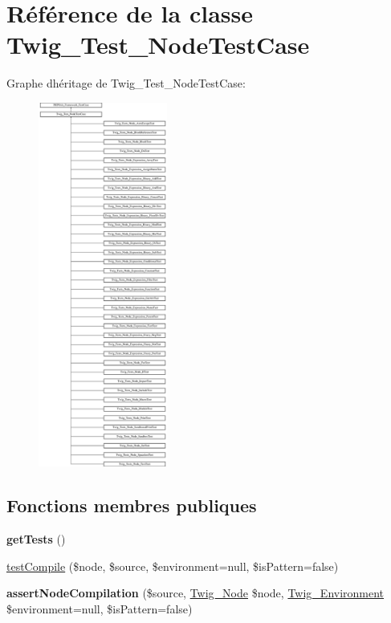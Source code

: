 \hypertarget{class_twig___test___node_test_case}{}\section{Référence de la classe Twig\+\_\+\+Test\+\_\+\+Node\+Test\+Case}
\label{class_twig___test___node_test_case}
Graphe d\textquotesingle{}héritage de Twig\+\_\+\+Test\+\_\+\+Node\+Test\+Case\+:\begin{figure}[H]
\begin{center}
\leavevmode
\includegraphics[height=12.000000cm]{class_twig___test___node_test_case}
\end{center}
\end{figure}
\subsection*{Fonctions membres publiques}
\begin{DoxyCompactItemize}
\item 
{\bfseries get\+Tests} ()\hypertarget{class_twig___test___node_test_case_a7e247dd31cc8d37a6c97353a062a0080}{}\label{class_twig___test___node_test_case_a7e247dd31cc8d37a6c97353a062a0080}

\item 
\hyperlink{class_twig___test___node_test_case_a4f762538907fa06b7a1d644f839c2acd}{test\+Compile} (\$node, \$source, \$environment=null, \$is\+Pattern=false)
\item 
{\bfseries assert\+Node\+Compilation} (\$source, \hyperlink{class_twig___node}{Twig\+\_\+\+Node} \$node, \hyperlink{class_twig___environment}{Twig\+\_\+\+Environment} \$environment=null, \$is\+Pattern=false)\hypertarget{class_twig___test___node_test_case_acc963089b63c19b5253f4bf3d915f283}{}\label{class_twig___test___node_test_case_acc963089b63c19b5253f4bf3d915f283}

\end{DoxyCompactItemize}
